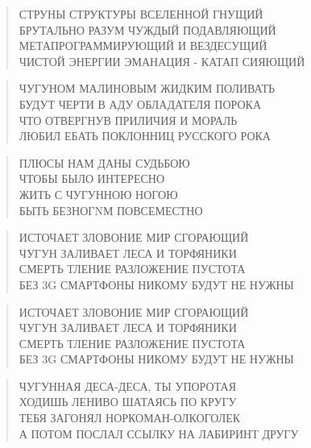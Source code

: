 \poemtitle{***}
\begin{verse}
СТРУНЫ СТРУКТУРЫ ВСЕЛЕННОЙ ГНУЩИЙ\\
БРУТАЛЬНО РАЗУМ ЧУЖДЫЙ ПОДАВЛЯЮЩИЙ\\
МЕТАПРОГРАММИРУЮЩИЙ И ВЕЗДЕСУЩИЙ\\
ЧИСТОЙ ЭНЕРГИИ ЭМАНАЦИЯ - КАТАП СИЯЮЩИЙ
\end{verse}

\poemtitle{***}
\begin{verse}
ЧУГУНОМ МАЛИНОВЫМ ЖИДКИМ ПОЛИВАТЬ\\
БУДУТ ЧЕРТИ В АДУ ОБЛАДАТЕЛЯ ПОРОКА\\
ЧТО ОТВЕРГНУВ ПРИЛИЧИЯ И МОРАЛЬ\\
ЛЮБИЛ ЕБАТЬ ПОКЛОННИЦ РУССКОГО РОКА
\end{verse}

\poemtitle{***}
\begin{verse}
ПЛЮСЫ НАМ ДАНЫ СУДЬБОЮ\\
ЧТОБЫ БЫЛО ИНТЕРЕСНО\\
ЖИТЬ С ЧУГУННОЮ НОГОЮ\\
БЫТЬ БЕЗНОГNМ ПОВСЕМЕСТНО
\end{verse}

\poemtitle{***}
\begin{verse}
ИСТОЧАЕТ ЗЛОВОНИЕ МИР СГОРАЮЩИЙ \\
ЧУГУН ЗАЛИВАЕТ ЛЕСА И ТОРФЯНИКИ\\
СМЕРТЬ ТЛЕНИЕ РАЗЛОЖЕНИЕ ПУСТОТА\\
БЕЗ 3G СМАРТФОНЫ НИКОМУ БУДУТ НЕ НУЖНЫ
\end{verse}

\poemtitle{***}
\begin{verse}
ИСТОЧАЕТ ЗЛОВОНИЕ МИР СГОРАЮЩИЙ \\
ЧУГУН ЗАЛИВАЕТ ЛЕСА И ТОРФЯНИКИ\\
СМЕРТЬ ТЛЕНИЕ РАЗЛОЖЕНИЕ ПУСТОТА\\
БЕЗ 3G СМАРТФОНЫ НИКОМУ БУДУТ НЕ НУЖНЫ
\end{verse}

\poemtitle{***}
\begin{verse}
ЧУГУННАЯ ДЕСА-ДЕСА, ТЫ УПОРОТАЯ \\
ХОДИШЬ ЛЕНИВО ШАТАЯСЬ ПО КРУГУ\\
ТЕБЯ ЗАГОНЯЛ НОРКОМАН-ОЛКОГОЛЕК\\
А ПОТОМ ПОСЛАЛ ССЫЛКУ НА ЛАБИРИНТ ДРУГУ
\end{verse}

